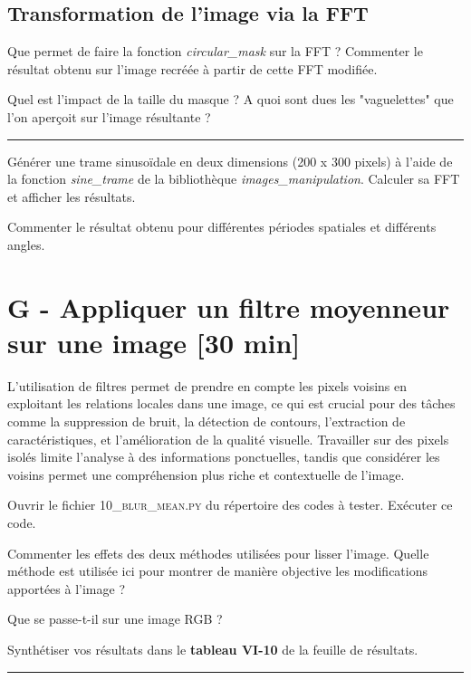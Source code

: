 \subsection{Transformation de l'image via la FFT}

\Quest Que permet de faire la fonction \textsl{circular\_mask} sur la FFT ? Commenter le résultat obtenu sur l'image recréée à partir de cette FFT modifiée.

\Quest Quel est l'impact de la taille du masque ? A quoi sont dues les "vaguelettes" que l'on aperçoit sur l'image résultante ?

\noindent \rule{\linewidth}{1pt}

\Manip Générer une trame sinusoïdale en deux dimensions (200 x 300 pixels) à l'aide de la fonction \textsl{sine\_trame} de la bibliothèque \textsl{images\_manipulation}. Calculer sa FFT et afficher les résultats.

\Quest Commenter le résultat obtenu pour différentes périodes spatiales et différents angles.


\section{G - Appliquer un filtre moyenneur sur une image {[30 min]}}

L'utilisation de filtres permet de prendre en compte les pixels voisins en exploitant les relations locales dans une image, ce qui est crucial pour des tâches comme la suppression de bruit, la détection de contours, l'extraction de caractéristiques, et l'amélioration de la qualité visuelle. Travailler sur des pixels isolés limite l'analyse à des informations ponctuelles, tandis que considérer les voisins permet une compréhension plus riche et contextuelle de l'image.

\medskip

\Manip Ouvrir le fichier \textsc{10\_blur\_mean.py} du répertoire des codes à tester. Exécuter ce code.

\Quest Commenter les effets des deux méthodes utilisées pour lisser l'image. Quelle méthode est utilisée ici pour montrer de manière objective les modifications apportées à l'image ? 

\Quest Que se passe-t-il sur une image RGB ? 

\Manip Synthétiser vos résultats dans le \textbf{tableau VI-10} de la feuille de résultats. 

\noindent \rule{\linewidth}{1pt}

